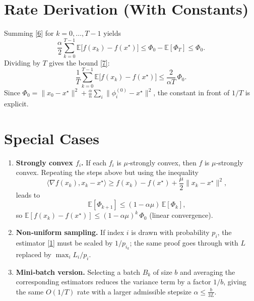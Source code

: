 \documentclass{article}
\newcommand{\E}{\mathbb{E}}
\begin{document}
\section*{Rate Derivation (With Constants)}
Summing \eqref{6} for $k=0,\dots,T-1$ yields
\[
\frac{\alpha}{2}\sum_{k=0}^{T-1}\E\!\bigl[f(x_k)-f(x^\star)\bigr]
\le \Phi_{0}-\E[\Phi_T]\le \Phi_{0}.
\]
Dividing by $T$ gives the bound \eqref{7}:
\[
\frac{1}{T}\sum_{k=0}^{T-1}\E\!\bigl[f(x_k)-f(x^\star)\bigr]
\le \frac{2}{\alpha T}\,\Phi_{0}.
\]
Since $\Phi_{0}= \|x_0-x^\star\|^{2}+ \frac{\alpha}{n}\sum_{i}\|\phi_i^{(0)}-x^\star\|^{2}$, the constant in front of $1/T$ is explicit.

\section*{Special Cases}
\begin{enumerate}[label=\alph*)]
\item \textbf{Strongly convex $f_i$.} If each $f_i$ is $\mu$‑strongly convex, then $f$ is $\mu$‑strongly convex. Repeating the steps above but using the inequality
\[
\langle \nabla f(x_k),x_k-x^\star\rangle \ge f(x_k)-f(x^\star)+\frac{\mu}{2}\|x_k-x^\star\|^{2},
\]
leads to
\[
\E[\Phi_{k+1}]\le (1-\alpha\mu)\,\E[\Phi_k],
\]
so $\E[f(x_k)-f(x^\star)]\le (1-\alpha\mu)^{k}\,\Phi_{0}$ (linear convergence).

\item \textbf{Non‑uniform sampling.} If index $i$ is drawn with probability $p_i$, the estimator \eqref{1} must be scaled by $1/p_{i_k}$; the same proof goes through with $L$ replaced by $\max_i L_i/p_i$.

\item \textbf{Mini‑batch version.} Selecting a batch $B_k$ of size $b$ and averaging the corresponding estimators reduces the variance term by a factor $1/b$, giving the same $O(1/T)$ rate with a larger admissible stepsize $\alpha\le \frac{b}{3L}$.
\end{enumerate}
\end{document}
